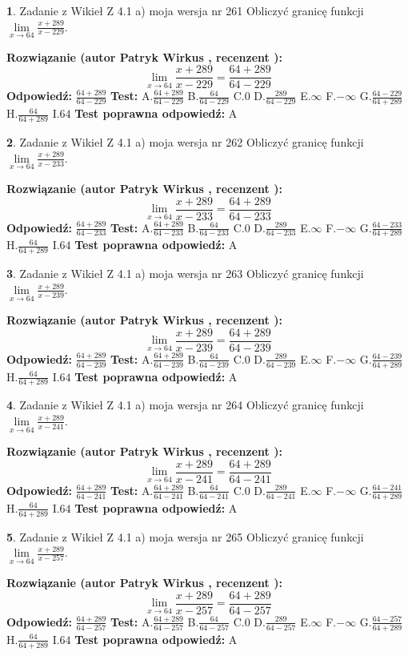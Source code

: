 \documentclass[12pt, a4paper]{article}
\theoremstyle{definition} %
\newtheorem{zad}{}
\newcommand{\zadStart}[1]{\begin{zad}#1\newline}
\newcommand{\zadStop}{\end{zad}}
\newcommand{\rozwStart}[2]{\noindent \textbf{Rozwiązanie (autor #1 , recenzent #2): }\newline}
\newcommand{\rozwStop}{\newline}
\newcommand{\odpStart}{\noindent \textbf{Odpowiedź:}\newline}
\newcommand{\odpStop}{\newline}
\newcommand{\testStart}{\noindent \textbf{Test:}\newline}
\newcommand{\testStop}{\newline}
\newcommand{\kluczStart}{\noindent \textbf{Test poprawna odpowiedź:}\newline}
\newcommand{\kluczStop}{\newline}
\begin{document}
\zadStart{Zadanie z Wikieł Z 4.1 a) moja wersja nr 261}
Obliczyć granicę funkcji $\lim\limits_{x\to64}\frac{x+289}{x-229}$.
\zadStop
\rozwStart{Patryk Wirkus}{}
$$\lim\limits_{x\to64}\frac{x+289}{x-229} = \frac{64+289}{64-229}$$
\rozwStop
\odpStart
$\frac{64+289}{64-229}$
\odpStop
\testStart
A.$\frac{64+289}{64-229}$
B.$\frac{64}{64-229}$
C.$0$
D.$\frac{289}{64-229}$
E.$\infty$
F.$-\infty$
G.$\frac{64-229}{64+289}$
H.$\frac{64}{64+289}$
I.$64$
\testStop
\kluczStart
A
\kluczStop



\zadStart{Zadanie z Wikieł Z 4.1 a) moja wersja nr 262}
Obliczyć granicę funkcji $\lim\limits_{x\to64}\frac{x+289}{x-233}$.
\zadStop
\rozwStart{Patryk Wirkus}{}
$$\lim\limits_{x\to64}\frac{x+289}{x-233} = \frac{64+289}{64-233}$$
\rozwStop
\odpStart
$\frac{64+289}{64-233}$
\odpStop
\testStart
A.$\frac{64+289}{64-233}$
B.$\frac{64}{64-233}$
C.$0$
D.$\frac{289}{64-233}$
E.$\infty$
F.$-\infty$
G.$\frac{64-233}{64+289}$
H.$\frac{64}{64+289}$
I.$64$
\testStop
\kluczStart
A
\kluczStop



\zadStart{Zadanie z Wikieł Z 4.1 a) moja wersja nr 263}
Obliczyć granicę funkcji $\lim\limits_{x\to64}\frac{x+289}{x-239}$.
\zadStop
\rozwStart{Patryk Wirkus}{}
$$\lim\limits_{x\to64}\frac{x+289}{x-239} = \frac{64+289}{64-239}$$
\rozwStop
\odpStart
$\frac{64+289}{64-239}$
\odpStop
\testStart
A.$\frac{64+289}{64-239}$
B.$\frac{64}{64-239}$
C.$0$
D.$\frac{289}{64-239}$
E.$\infty$
F.$-\infty$
G.$\frac{64-239}{64+289}$
H.$\frac{64}{64+289}$
I.$64$
\testStop
\kluczStart
A
\kluczStop



\zadStart{Zadanie z Wikieł Z 4.1 a) moja wersja nr 264}
Obliczyć granicę funkcji $\lim\limits_{x\to64}\frac{x+289}{x-241}$.
\zadStop
\rozwStart{Patryk Wirkus}{}
$$\lim\limits_{x\to64}\frac{x+289}{x-241} = \frac{64+289}{64-241}$$
\rozwStop
\odpStart
$\frac{64+289}{64-241}$
\odpStop
\testStart
A.$\frac{64+289}{64-241}$
B.$\frac{64}{64-241}$
C.$0$
D.$\frac{289}{64-241}$
E.$\infty$
F.$-\infty$
G.$\frac{64-241}{64+289}$
H.$\frac{64}{64+289}$
I.$64$
\testStop
\kluczStart
A
\kluczStop



\zadStart{Zadanie z Wikieł Z 4.1 a) moja wersja nr 265}
Obliczyć granicę funkcji $\lim\limits_{x\to64}\frac{x+289}{x-257}$.
\zadStop
\rozwStart{Patryk Wirkus}{}
$$\lim\limits_{x\to64}\frac{x+289}{x-257} = \frac{64+289}{64-257}$$
\rozwStop
\odpStart
$\frac{64+289}{64-257}$
\odpStop
\testStart
A.$\frac{64+289}{64-257}$
B.$\frac{64}{64-257}$
C.$0$
D.$\frac{289}{64-257}$
E.$\infty$
F.$-\infty$
G.$\frac{64-257}{64+289}$
H.$\frac{64}{64+289}$
I.$64$
\testStop
\kluczStart
A
\kluczStop
\end{document}
